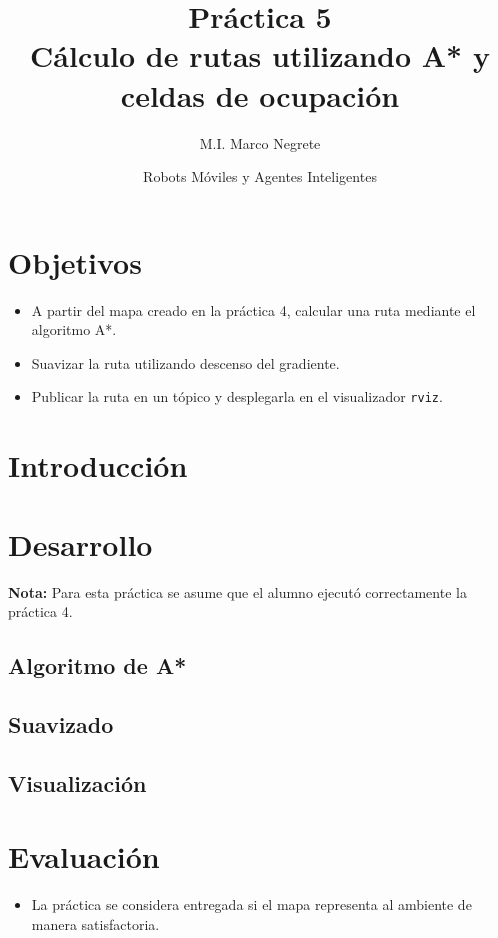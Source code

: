 \documentclass[letterpaper,12pt]{article}
\title{Práctica 5  \\ Cálculo de rutas utilizando A* y celdas de ocupación}
\author{M.I. Marco Negrete}
\date{Robots Móviles y Agentes Inteligentes}
\begin{document}
\renewcommand{\tablename}{Tabla}
\maketitle
\section*{Objetivos}
\begin{itemize}
\item A partir del mapa creado en la práctica 4, calcular una ruta mediante el algoritmo A*.
\item Suavizar la ruta utilizando descenso del gradiente. 
\item Publicar la ruta en un tópico y desplegarla en el visualizador \texttt{rviz}.
\end{itemize}

\section{Introducción}

\section{Desarrollo}
\textbf{Nota:} Para esta práctica se asume que el alumno ejecutó correctamente la práctica 4.

\subsection{Algoritmo de A*}
\subsection{Suavizado}
\subsection{Visualización}
\section{Evaluación}
\begin{itemize}
\item La práctica se considera entregada si el mapa representa al ambiente de manera satisfactoria. 
\end{itemize}
\end{document}
